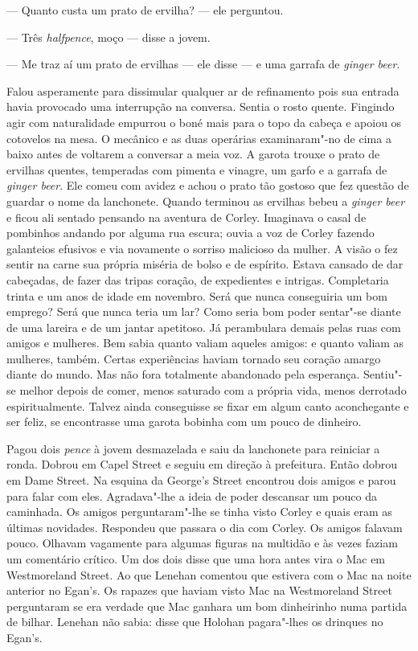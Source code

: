 --- Quanto custa um prato de ervilha? --- ele perguntou.

--- Três \textit{halfpence}, moço --- disse a jovem.

--- Me traz aí um prato de ervilhas --- ele disse --- e uma garrafa de
\textit{ginger beer}.

Falou asperamente para dissimular qualquer ar de refinamento pois sua entrada
havia provocado uma interrupção na conversa.  Sentia o rosto quente.  Fingindo
agir com naturalidade empurrou o boné mais para o topo da cabeça e apoiou os
cotovelos na mesa.  O mecânico e as duas operárias examinaram"-no de cima a
baixo antes de voltarem a conversar a meia voz.  A garota trouxe o prato de
ervilhas quentes, temperadas com pimenta e vinagre, um garfo e a garrafa de
\textit{ginger beer}.  Ele comeu com avidez e achou o prato tão gostoso que fez
questão de guardar o nome da lanchonete.  Quando terminou as ervilhas bebeu a
\textit{ginger beer} e ficou ali sentado pensando na aventura de Corley.
Imaginava o casal de pombinhos andando por alguma rua escura; ouvia a voz de
Corley fazendo galanteios efusivos e via novamente o sorriso malicioso da
mulher.  A visão o fez sentir na carne sua própria miséria de bolso e de
espírito.  Estava cansado de dar cabeçadas, de fazer das tripas coração, de
expedientes e intrigas.  Completaria trinta e um anos de idade em novembro.
Será que nunca conseguiria um bom emprego?  Será que nunca teria um lar?  Como
seria bom poder sentar"-se diante de uma lareira e de um jantar apetitoso.  Já
perambulara demais pelas ruas com amigos e mulheres.  Bem sabia quanto valiam
aqueles amigos: e quanto valiam as mulheres, também.  Certas experiências
haviam tornado seu coração amargo diante do mundo.  Mas não fora totalmente
abandonado pela esperança.  Sentiu"-se melhor depois de comer, menos saturado
com a própria vida, menos derrotado espiritualmente.  Talvez ainda conseguisse
se fixar em algum canto aconchegante e ser feliz, se encontrasse uma garota
bobinha com um pouco de dinheiro.

Pagou dois \textit{pence} à jovem desmazelada e saiu da lanchonete para
reiniciar a ronda.  Dobrou em Capel Street e seguiu em direção à prefeitura.
Então dobrou em Dame Street.  Na esquina da George’s Street encontrou dois
amigos e parou para falar com eles.  Agradava"-lhe a ideia de poder descansar um
pouco da caminhada.  Os amigos perguntaram"-lhe se tinha visto Corley e quais
eram as últimas novidades.  Respondeu que passara o dia com Corley.  Os amigos
falavam pouco.  Olhavam vagamente para algumas figuras na multidão e às vezes
faziam um comentário crítico.  Um dos dois disse que uma hora antes vira o Mac
em Westmoreland Street.  Ao que Lenehan comentou que estivera com o Mac na
noite anterior no Egan’s.  Os rapazes que haviam visto Mac na Westmoreland
Street perguntaram se era verdade que Mac ganhara um bom dinheirinho numa
partida de bilhar.  Lenehan não sabia: disse que Holohan pagara"-lhes os
drinques no Egan’s.

